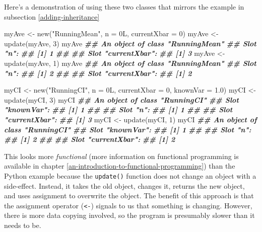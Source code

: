 \documentclass[
  12pt,
  krantz2]{krantz}
\makeatletter
\newenvironment{Shaded}{\begin{snugshade}}{\end{snugshade}}
\newcommand{\AttributeTok}[1]{\textcolor[rgb]{0.61,0.61,0.61}{#1}}
\newcommand{\DecValTok}[1]{\textcolor[rgb]{0.06,0.06,0.06}{#1}}
\newcommand{\DocumentationTok}[1]{\textcolor[rgb]{0.37,0.37,0.37}{\textbf{\textit{#1}}}}
\newcommand{\FloatTok}[1]{\textcolor[rgb]{0.06,0.06,0.06}{#1}}
\newcommand{\FunctionTok}[1]{\textcolor[rgb]{0,0,0}{#1}}
\newcommand{\NormalTok}[1]{#1}
\newcommand{\OtherTok}[1]{\textcolor[rgb]{0.37,0.37,0.37}{#1}}
\newcommand{\StringTok}[1]{\textcolor[rgb]{0.5,0.5,0.5}{#1}}
\newenvironment{kframe}{%
\medskip{}
\setlength{\fboxsep}{.8em}
 \def\at@end@of@kframe{}%
 \ifinner\ifhmode%
  \def\at@end@of@kframe{\end{minipage}}%
  \begin{minipage}{\columnwidth}%
 \fi\fi%
 \def\FrameCommand##1{\hskip\@totalleftmargin \hskip-\fboxsep
 \colorbox{shadecolor}{##1}\hskip-\fboxsep
     \hskip-\linewidth \hskip-\@totalleftmargin \hskip\columnwidth}%
 \MakeFramed {\advance\hsize-\width
   \@totalleftmargin\z@ \linewidth\hsize
   \@setminipage}}%
 {\par\unskip\endMakeFramed%
 \at@end@of@kframe}
\renewenvironment{Shaded}{\begin{kframe}}{\end{kframe}}
\makeatother
\begin{document}
Here's a demonstration of using these two classes that mirrors the example in subsection \ref{adding-inheritance}

\begin{Shaded}
\begin{Highlighting}[]
\NormalTok{myAve }\OtherTok{\textless{}{-}} \FunctionTok{new}\NormalTok{(}\StringTok{"RunningMean"}\NormalTok{, }\AttributeTok{n =}\NormalTok{ 0L, }\AttributeTok{currentXbar =} \DecValTok{0}\NormalTok{)}
\NormalTok{myAve }\OtherTok{\textless{}{-}} \FunctionTok{update}\NormalTok{(myAve, }\DecValTok{3}\NormalTok{)}
\NormalTok{myAve}
\DocumentationTok{\#\# An object of class "RunningMean"}
\DocumentationTok{\#\# Slot "n":}
\DocumentationTok{\#\# [1] 1}
\DocumentationTok{\#\# }
\DocumentationTok{\#\# Slot "currentXbar":}
\DocumentationTok{\#\# [1] 3}
\NormalTok{myAve }\OtherTok{\textless{}{-}} \FunctionTok{update}\NormalTok{(myAve, }\DecValTok{1}\NormalTok{)}
\NormalTok{myAve}
\DocumentationTok{\#\# An object of class "RunningMean"}
\DocumentationTok{\#\# Slot "n":}
\DocumentationTok{\#\# [1] 2}
\DocumentationTok{\#\# }
\DocumentationTok{\#\# Slot "currentXbar":}
\DocumentationTok{\#\# [1] 2}

\NormalTok{myCI }\OtherTok{\textless{}{-}} \FunctionTok{new}\NormalTok{(}\StringTok{"RunningCI"}\NormalTok{, }\AttributeTok{n =}\NormalTok{ 0L, }\AttributeTok{currentXbar =} \DecValTok{0}\NormalTok{, }\AttributeTok{knownVar =} \FloatTok{1.0}\NormalTok{)}
\NormalTok{myCI }\OtherTok{\textless{}{-}} \FunctionTok{update}\NormalTok{(myCI, }\DecValTok{3}\NormalTok{)}
\NormalTok{myCI}
\DocumentationTok{\#\# An object of class "RunningCI"}
\DocumentationTok{\#\# Slot "knownVar":}
\DocumentationTok{\#\# [1] 1}
\DocumentationTok{\#\# }
\DocumentationTok{\#\# Slot "n":}
\DocumentationTok{\#\# [1] 1}
\DocumentationTok{\#\# }
\DocumentationTok{\#\# Slot "currentXbar":}
\DocumentationTok{\#\# [1] 3}
\NormalTok{myCI }\OtherTok{\textless{}{-}} \FunctionTok{update}\NormalTok{(myCI, }\DecValTok{1}\NormalTok{)}
\NormalTok{myCI}
\DocumentationTok{\#\# An object of class "RunningCI"}
\DocumentationTok{\#\# Slot "knownVar":}
\DocumentationTok{\#\# [1] 1}
\DocumentationTok{\#\# }
\DocumentationTok{\#\# Slot "n":}
\DocumentationTok{\#\# [1] 2}
\DocumentationTok{\#\# }
\DocumentationTok{\#\# Slot "currentXbar":}
\DocumentationTok{\#\# [1] 2}
\end{Highlighting}
\end{Shaded}

This looks more \emph{functional} (more information on functional programming is available in chapter \ref{an-introduction-to-functional-programming}) than the Python example because the \texttt{update()} function does not change an object with a side-effect. Instead, it takes the old object, changes it, returns the new object, and uses assignment to overwrite the object. The benefit of this approach is that the assignment operator (\texttt{\textless{}-}) signals to us that something is changing. However, there is more data copying involved, so the program is presumably slower than it needs to be.
\end{document}
